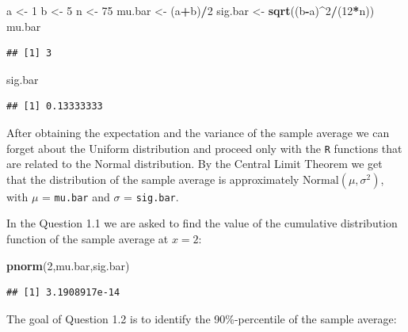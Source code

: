 \documentclass[]{krantz}
\makeatletter
\newenvironment{Shaded}{\begin{snugshade}}{\end{snugshade}}
\newcommand{\DecValTok}[1]{\textcolor[rgb]{0.00,0.00,0.81}{#1}}
\newcommand{\KeywordTok}[1]{\textcolor[rgb]{0.13,0.29,0.53}{\textbf{#1}}}
\newcommand{\NormalTok}[1]{#1}
\newcommand{\OperatorTok}[1]{\textcolor[rgb]{0.81,0.36,0.00}{\textbf{#1}}}
\newcommand{\StringTok}[1]{\textcolor[rgb]{0.31,0.60,0.02}{#1}}
\newenvironment{kframe}{%
\medskip{}
\setlength{\fboxsep}{.8em}
 \def\at@end@of@kframe{}%
 \ifinner\ifhmode%
  \def\at@end@of@kframe{\end{minipage}}%
  \begin{minipage}{\columnwidth}%
 \fi\fi%
 \def\FrameCommand##1{\hskip\@totalleftmargin \hskip-\fboxsep
 \colorbox{shadecolor}{##1}\hskip-\fboxsep
     \hskip-\linewidth \hskip-\@totalleftmargin \hskip\columnwidth}%
 \MakeFramed {\advance\hsize-\width
   \@totalleftmargin\z@ \linewidth\hsize
   \@setminipage}}%
 {\par\unskip\endMakeFramed%
 \at@end@of@kframe}
\renewenvironment{Shaded}{\begin{kframe}}{\end{kframe}}
\theoremstyle{definition}
\theoremstyle{definition}
\theoremstyle{definition}
\theoremstyle{remark}
\makeatother
\begin{document}
\begin{Shaded}
\begin{Highlighting}[]
\NormalTok{a <-}\StringTok{ }\DecValTok{1}
\NormalTok{b <-}\StringTok{ }\DecValTok{5}
\NormalTok{n <-}\StringTok{ }\DecValTok{75}
\NormalTok{mu.bar <-}\StringTok{ }\NormalTok{(a}\OperatorTok{+}\NormalTok{b)}\OperatorTok{/}\DecValTok{2}
\NormalTok{sig.bar <-}\StringTok{ }\KeywordTok{sqrt}\NormalTok{((b}\OperatorTok{-}\NormalTok{a)}\OperatorTok{^}\DecValTok{2}\OperatorTok{/}\NormalTok{(}\DecValTok{12}\OperatorTok{*}\NormalTok{n))}
\NormalTok{mu.bar}
\end{Highlighting}
\end{Shaded}

\begin{verbatim}
## [1] 3
\end{verbatim}

\begin{Shaded}
\begin{Highlighting}[]
\NormalTok{sig.bar}
\end{Highlighting}
\end{Shaded}

\begin{verbatim}
## [1] 0.13333333
\end{verbatim}

After obtaining the expectation and the variance of the sample average
we can forget about the Uniform distribution and proceed only with the
\texttt{R} functions that are related to the Normal distribution. By the
Central Limit Theorem we get that the distribution of the sample average
is approximately \(\mathrm{Normal}(\mu, \sigma^2)\), with \(\mu\) = \texttt{mu.bar}
and \(\sigma\) = \texttt{sig.bar}.

In the Question 1.1 we are asked to find the value of the cumulative
distribution function of the sample average at \(x=2\):

\begin{Shaded}
\begin{Highlighting}[]
\KeywordTok{pnorm}\NormalTok{(}\DecValTok{2}\NormalTok{,mu.bar,sig.bar)}
\end{Highlighting}
\end{Shaded}

\begin{verbatim}
## [1] 3.1908917e-14
\end{verbatim}

The goal of Question 1.2 is to identify the 90\%-percentile of the sample
average:
\end{document}
